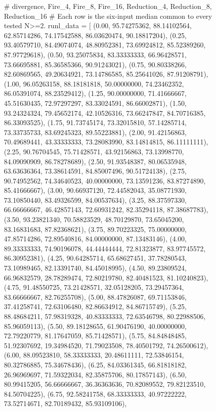 \begin{figure}[H]
\begin{CacheMeCode}
# divergence, Fire_4, Fire_8, Fire_16, Reduction_4, Reduction_8, Reduction_16
# Each row is the six-input median common to every tested N>=2.
runl_data = [
    (0.00, 95.74275362, 88.14102564, 62.85714286, 74.17542588, 86.03620474, 90.18817204),
    (0.25, 93.40579710, 84.49074074, 48.80952381, 73.69924812, 85.52389260, 87.97729618),
    (0.50, 93.25075834, 83.33333333, 66.96428571, 73.66695881, 85.36585366, 90.91243021),
    (0.75, 90.80338266, 82.60869565, 49.20634921, 73.14786585, 85.25641026, 87.91208791),
    (1.00, 96.05263158, 88.18181818, 50.00000000, 74.23462352, 86.05391074, 88.23529412),
    (1.25, 90.00000000, 71.41666667, 45.51630435, 72.97297297, 83.33024591, 86.66002871),
    (1.50, 93.24324324, 79.45652174, 42.10526316, 73.66247847, 84.70716385, 86.33093525),
    (1.75, 91.73745174, 73.32015810, 57.14285714, 73.33735733, 83.69245323, 89.55223881),
    (2.00, 91.42156863, 70.49689441, 43.33333333, 73.28083990, 83.14814815, 86.11111111),
    (2.25, 90.76704545, 75.71428571, 43.92156863, 73.13998770, 84.09090909, 86.78278689),
    (2.50, 91.93548387, 80.06535948, 63.63636364, 73.38614591, 84.85007496, 90.51724138),
    (2.75, 90.74952562, 74.34640523, 40.00000000, 73.13591236, 83.87274890, 85.41666667),
    (3.00, 90.66937120, 72.44582043, 35.08771930, 73.10850440, 83.49326599, 84.00537634),
    (3.25, 88.37597330, 66.66666667, 46.42857143, 72.60931242, 82.35294118, 87.38687783),
    (3.50, 93.23821340, 70.58823529, 48.70129870, 73.65045200, 83.16831683, 87.82368621),
    (3.75, 89.70223325, 75.00000000, 47.85714286, 72.89540816, 84.00000000, 87.13483146),
    (4.00, 89.33333333, 74.90196078, 44.44444444, 72.81323877, 83.97745572, 86.30952381),
    (4.25, 90.64285714, 65.68627451, 37.78280543, 73.10989465, 82.13391740, 84.45018995),
    (4.50, 89.23809524, 66.96832579, 28.78289474, 72.80219780, 82.40481523, 81.10240823),
    (4.75, 91.48550725, 73.21428571, 32.05128205, 73.29457364, 83.66666667, 82.76255708),
    (5.00, 88.47826087, 69.71153846, 37.41258741, 72.63106480, 82.86634912, 84.86715749),
    (5.25, 88.48684211, 57.98319328, 40.83333333, 72.63546798, 80.22988506, 85.96059113),
    (5.50, 89.18128655, 61.90476190, 40.00000000, 72.79220779, 81.17647059, 85.71428571),
    (5.75, 84.84848485, 51.92307692, 19.34984520, 71.79023508, 78.40501792, 74.26500612),
    (6.00, 88.09523810, 58.33333333, 20.48611111, 72.53846154, 80.32786885, 75.34678436),
    (6.25, 84.03361345, 66.81818182, 26.96969697, 71.59322034, 82.35875706, 80.17857143),
    (6.50, 80.99415205, 56.66666667, 36.36363636, 70.82089552, 79.82123510, 84.50704225),
    (6.75, 92.58241758, 68.33333333, 40.97222222, 73.52714671, 82.70189432, 85.93109106),

\end{CacheMeCode}
\end{figure}
